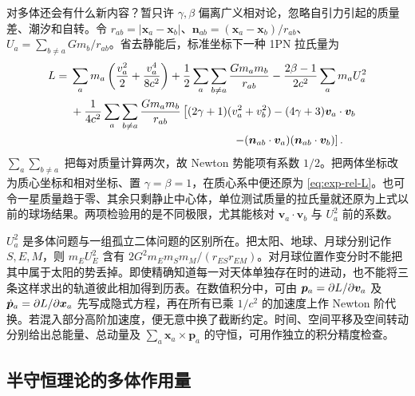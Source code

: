 对多体还会有什么新内容？暂只许 $\gamma,\beta$ 偏离广义相对论，忽略自引力引起的质量差、潮汐和自转。令 $r_{ab}=|\bm x_a-\bm x_b|$、$\bm n_{ab}=(\bm x_a-\bm x_b)/r_{ab}$、$U_a=\sum_{b\ne a}Gm_b/r_{ab}$。省去静能后，标准坐标下一种 1PN 拉氏量为
\begin{align}
 L={}&\sum_a m_a\left(\frac{v_a^2}{2}+\frac{v_a^4}{8c^2}\right)
       +\frac12\sum_{a}\sum_{b\ne a}\frac{Gm_am_b}{r_{ab}}
       -\frac{2\beta-1}{2c^2}\sum_a m_a U_a^2 \nonumber\\
 &+\frac{1}{4c^2}\sum_a\sum_{b\ne a}\frac{Gm_am_b}{r_{ab}}
 \left[(2\gamma+1)(v_a^2+v_b^2)-(4\gamma+3)\bm v_a\cdot\bm v_b
 \right.\nonumber\\[-1pt]
 &\hspace{51mm}\left.-(\bm n_{ab}\cdot\bm v_a)(\bm n_{ab}\cdot\bm v_b)\right].
 \label{eq:exp-nbody-lag}
\end{align}
$\sum_a\sum_{b\ne a}$ 把每对质量计算两次，故 Newton 势能项有系数 $1/2$。把两体坐标改为质心坐标和相对坐标、置 $\gamma=\beta=1$，在质心系中便还原为 \eqref{eq:exp-rel-L}。也可令一星质量趋于零、其余只剩静止中心体，单位测试质量的拉氏量就还原为上式以前的球场结果。两项检验用的是不同极限，尤其能核对 $\bm v_a\cdot\bm v_b$ 与 $U_a^2$ 前的系数。

$U_a^2$ 是多体问题与一组孤立二体问题的区别所在。把太阳、地球、月球分别记作 $S,E,M$，则 $m_EU_E^2$ 含有 $2G^2m_E m_S m_M/(r_{ES}r_{EM})$。对月球位置作变分时不能把其中属于太阳的势丢掉。即使精确知道每一对天体单独存在时的进动，也不能将三条这样求出的轨道彼此相加得到历表。在数值积分中，可由 $\bm p_a=\partial L/\partial\bm v_a$ 及 $\dot{\bm p}_a=\partial L/\partial\bm x_a$ 先写成隐式方程，再在所有已乘 $1/c^2$ 的加速度上作 Newton 阶代换。若混入部分高阶加速度，便无意中换了截断约定。时间、空间平移及空间转动分别给出总能量、总动量及 $\sum_a\bm x_a\times\bm p_a$ 的守恒，可用作独立的积分精度检查。

\subsection{半守恒理论的多体作用量}

